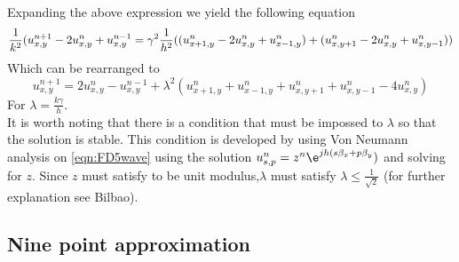 Expanding the above expression we yield the following equation
\begin{equation}
	\frac{1}{k^2}(u^{n+1}_{x,y}-2u^{n}_{x,y}+u^{n-1}_{x,y}=\gamma^{2}\frac{1}{h^2}((u^{n}_{x+1,y}-2u^{n}_{x,y}+u^{n}_{x-1,y})+(u^{n}_{x,y+1}-2u^{n}_{x,y}+u^{n}_{x,y-1}))\\
\end{equation}
Which can be rearranged to
\begin{equation}
\label{eqn:FD5wave}
	u^{n+1}_{x,y}=2u^{n}_{x,y}-u^{n-1}_{x,y}+\lambda^{2}(u^{n}_{x+1,y}+u^{n}_{x-1,y}+u^{n}_{x,y+1}+u^{n}_{x,y-1}-4u^{n}_{x,y})
\end{equation}
For $\lambda=\frac{k\gamma}{h}$.\\
It is worth noting that there is a condition that must be impossed to $\lambda$ so that the solution is stable. This condition is developed by using Von Neumann analysis on \ref{eqn:FD5wave} using the solution $u^{n}_{s,p}=z^{n}\e^{jh(s\beta_{x}+p\beta_{y}})$ and solving for $z$. Since $z$ must satisfy to be unit modulus,$\lambda$ must satisfy $\lambda\leq \frac{1}{\sqrt{2}}$ (for further explanation see Bilbao).
\subsection{Nine point approximation}
\label{chapter3:sec1:ssec2}

